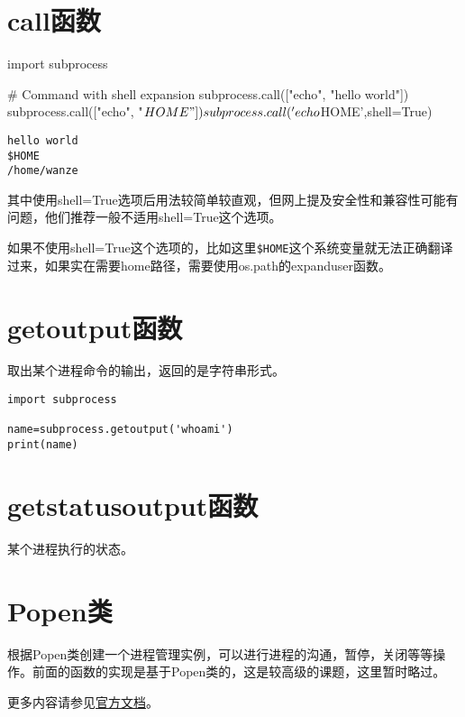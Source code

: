 \documentclass[12pt,oneside]{book}
\begin{document}
\begin{common-format}
\section{call函数}
\begin{tcbpython}[]
import subprocess

# Command with shell expansion
subprocess.call(["echo", "hello world"])
subprocess.call(["echo", "$HOME"])
subprocess.call('echo $HOME',shell=True)
\end{tcbpython}
\begin{Verbatim}
hello world
$HOME
/home/wanze
\end{Verbatim}

其中使用shell=True选项后用法较简单较直观，但网上提及安全性和兼容性可能有问题，他们推荐一般不适用shell=True这个选项。

如果不使用shell=True这个选项的，比如这里\verb+$HOME+这个系统变量就无法正确翻译过来，如果实在需要home路径，需要使用os.path的expanduser函数。



\section{getoutput函数}
取出某个进程命令的输出，返回的是字符串形式。
\begin{Verbatim}
import subprocess

name=subprocess.getoutput('whoami')
print(name)
\end{Verbatim}



\section{getstatusoutput函数}
某个进程执行的状态。



\section{Popen类}
根据Popen类创建一个进程管理实例，可以进行进程的沟通，暂停，关闭等等操作。前面的函数的实现是基于Popen类的，这是较高级的课题，这里暂时略过。



\begin{large}
更多内容请参见\href{https://docs.python.org/3/library/subprocess.html}{官方文档}。
\end{large}




\end{common-format}
\end{document}
